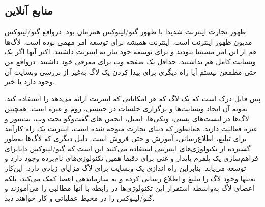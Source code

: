 \subsection{منابع آنلاین}

ظهور تجارت اینترنت شدیدا با ظهور گنو/لینوکس همزمان بود. درواقع
گنو/لینوکس مدیون ظهور اینترنت است. اینترنت همیشه برای توسعه امر مهمی بوده است.
لاگ‌ها هم از این امر مستثنا نبودند و برای توسعه خود نیاز به اینترنت داشتند.
اکثر آنها اگر یک وبسایت کامل هم نداشتند، حداقل یک صفحه وب برای معرفی خود داشتند.
درواقع من حتی مطمعن نیستم آیا راه دیگری برای پیدا کردن یک لاگ به‌غیر از بررسی وبسایت
آن وجود دارد یا خیر.

پس قابل درک است که یک لاگ که هر امکاناتی که اینترنت ارائه می‌دهد را استفاده کند.
نمونه آن ایجاد وبسایت‌ها و برگزاری جلسات در جیتسی، زوم و غیره است.
همچنین لاگ‌ها در لیست‌های پستی، ویکی‌ها، ایمیل، انجمن های گفت‌وگو تحت وب، نت‌نیوز و غیره
فعالیت دارند.
همانطور که دنیای تجارت متوجه شده است، اینترنت یک راه کارآمد برای تبلیغ، اطلاع‌رسانی،
آموزش و حتی فروش است.
دلیل دیگری که لاگ‌ها به‌طور گسترده از تکنولوژی‌های اینترنتی استفاده می‌کنند این است که
گنو/لینوکس ذاتابرای فراهم‌سازی یک پلفرم پایدار و غنی برای
دقیقا همین تکنولوژی‌های نام‌برده وجود دارد و توسعه می‌یابد.
بنابراین راه اندازی یک وبسایت برای لاگ مزایای زیادی دارد. این‌کار نه‌تنها وجود لاگ را
تبلیغ و اطلاع رسانی کرده و به سازماندهی اعضا کمک می‌کند، بلکه اعضای لاگ به‌واسطه
استقرار این تکنولوژی‌ها در رابطه با آنها مطالبی را می‌آموزند و گنو/لینوکس را در محیط
عملیاتی و کار خواهند دید.

